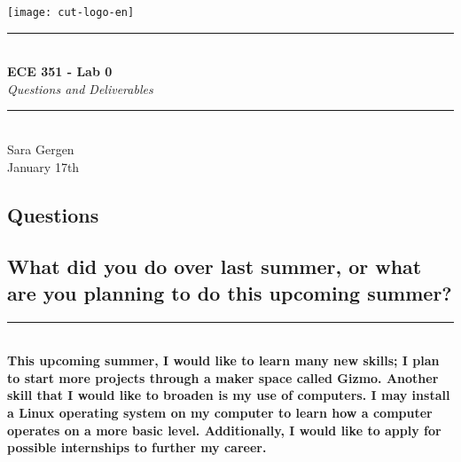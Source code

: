 \documentclass[12pt,a4paper]{article}
\newcommand{\HRule}{\rule{\linewidth}{0.5mm}}
\begin{document}
\begin{titlepage}
\begin{center}

\texttt{[image: cut-logo-en]}~\\[2cm]


\HRule \\[0.4cm]
{ \LARGE 
  \textbf{ECE 351 - Lab 0 }\\[0.4cm]
  \emph{Questions and Deliverables}\\[0.4cm]
}
\HRule \\[1.5cm]



{ \large
  Sara Gergen \\[0.1cm]
  January 17th\\[0.1cm]
  
}

\vfill

 
\end{center}
\end{titlepage}


\newpage




\newpage
\setcounter{page}{1}

\begin{center}
    
\section{\LARGE Questions}

\end{center}

{\large
    \subsection{What did you do over last summer, or what are you planning to do this upcoming summer?}
}

\HRule \\[10]
   
    \textbf{This upcoming summer, I would like to learn many new skills; I plan to start more projects through a maker space called Gizmo. Another skill that I would like to broaden is my use of computers. I may install a Linux operating system on my computer to learn how a computer operates on a more basic level.
    Additionally, I would like to apply for possible internships to further my career. } 
\end{document}
